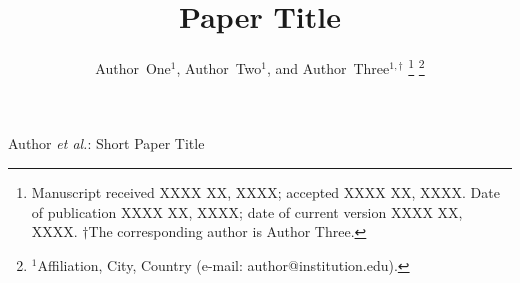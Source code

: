 \documentclass[journal,twoside]{IEEEtran}
\begin{document}
\graphicspath{{./figures/}{./photos/}{./}}

\title{Paper Title}

\author{
Author~One$^{1}$,
Author~Two$^{1}$, and
Author~Three$^{1,\dagger}$
\thanks{Manuscript received XXXX XX, XXXX; accepted XXXX XX, XXXX.
Date of publication XXXX XX, XXXX; date of current version XXXX XX, XXXX.
$\dagger$The corresponding author is Author Three.}
\thanks{$^{1}$Affiliation, City, Country (e-mail: author@institution.edu).}}

%
{Author \MakeLowercase{\textit{et al.}}: Short Paper Title}

\IEEEoverridecommandlockouts
{}

\maketitle










\end{document}
